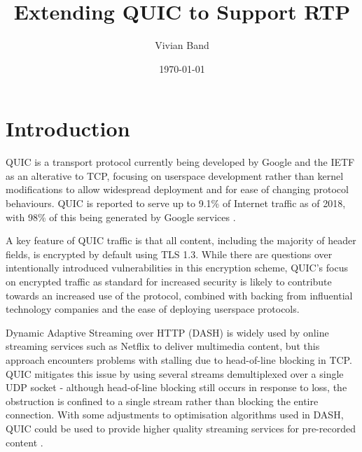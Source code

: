\documentclass{mprop}
\begin{document}
\title{Extending QUIC to Support RTP}
\author{Vivian Band}
\date{\today}
\maketitle

\tableofcontents
\newpage

\section{Introduction}\label{intro}


QUIC is a transport protocol currently being developed by Google and the IETF as an alterative to TCP, focusing on userspace development rather than kernel modifications to allow widespread deployment and for ease of changing protocol behaviours. QUIC is reported to serve up to 9.1\% of Internet traffic as of 2018, with 98\% of this being generated by Google services \cite{Ruth2018}. 

A key feature of QUIC traffic is that all content, including the majority of header fields, is encrypted by default using TLS 1.3. While there are questions over intentionally introduced vulnerabilities in this encryption scheme, QUIC's focus on encrypted traffic as standard for increased security is likely to contribute towards an increased use of the protocol, combined with backing from influential technology companies and the ease of deploying userspace protocols.

Dynamic Adaptive Streaming over HTTP (DASH) is widely used by online streaming services such as Netflix to deliver multimedia content, but this approach encounters problems with stalling due to head-of-line blocking in TCP. QUIC mitigates this issue by using several streams demultiplexed over a single UDP socket - although head-of-line blocking still occurs in response to loss, the obstruction is confined to a single stream rather than blocking the entire connection. With some adjustments to optimisation algorithms used in DASH, QUIC could be used to provide higher quality streaming services for pre-recorded content \cite{Bhat2017}.
\end{document}
